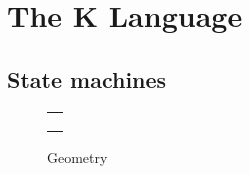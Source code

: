 \section{The K Language}

\subsection{State machines}



\begin{figure}
\centering
\begin{tabular}{c}
\hline \\
 \\ \\
\hline
\end{tabular}
\caption{Geometry}
\label{fig:shapes}
\end{figure}



